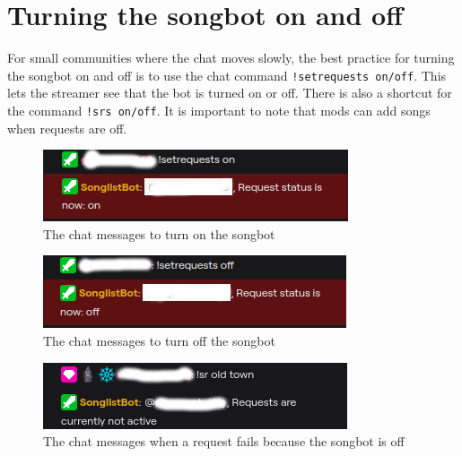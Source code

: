 
\section{Turning the songbot on and off}
For small communities where the chat moves slowly, the best practice for turning the songbot on and off is to use the chat command \lstinline{!setrequests on/off}. This lets the streamer see that the bot is turned on or off. There is also a shortcut for the command \lstinline{!srs on/off}. It is important to note that mods can add songs when requests are off.

\begin{figure}[ht!]
  \includegraphics[width=\linewidth]{src/songbot_on_off/setrequests_on.png}
  \caption{The chat messages to turn on the songbot}
  \label{setrequests on}
\end{figure}
\begin{figure}[ht!]
  \includegraphics[width=\linewidth]{src/songbot_on_off/setrequests_off.png}
  \caption{The chat messages to turn off the songbot}
  \label{setrequests off}
\end{figure}
\begin{figure}[ht!]
  \includegraphics[width=\linewidth]{src/songbot_on_off/request_failed.png}
  \caption{The chat messages when a request fails because the songbot is off}
  \label{request failed}
\end{figure}

